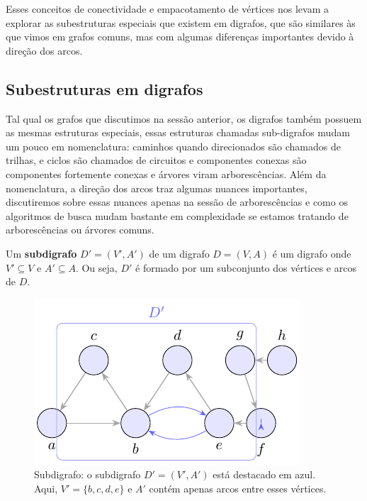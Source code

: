 Esses conceitos de conectividade e empacotamento de vértices nos levam a explorar as subestruturas especiais que existem em digrafos, que são similares às que vimos em grafos comuns, mas com algumas diferenças importantes devido à direção dos arcos.

\subsection{Subestruturas em digrafos}


Tal qual os grafos que discutimos na sessão anterior, os digrafos também possuem as mesmas estruturas especiais, essas estruturas chamadas sub-digrafos mudam um pouco em nomenclatura: caminhos quando direcionados são chamados de trilhas, e ciclos são chamados de circuitos e componentes conexas são componentes fortemente conexas e árvores viram arborescências. Além da nomenclatura, a direção dos arcos traz algumas nuances importantes, discutiremos sobre essas nuances apenas na sessão de arborescências e como os algoritmos de busca mudam bastante em complexidade se estamos tratando de arborescências ou árvores comuns.


Um \textbf{subdigrafo} \(D' = (V', A')\) de um digrafo \(D = (V, A)\) é um digrafo onde \(V' \subseteq V\) e \(A' \subseteq A\). Ou seja, \(D'\) é formado por um subconjunto dos vértices e arcos de \(D\).


\begin{figure}[H]
	\centering
	\includegraphics[width=0.9\linewidth]{figures/fig_subdigrafo.pdf}

	\caption{Subdigrafo: o subdigrafo $D'=(V',A')$ está destacado em azul. Aqui, $V'=\{b,c,d,e\}$ e $A'$ contém apenas arcos entre esses vértices.}
	\label{fig:subdigrafo}
\end{figure}


